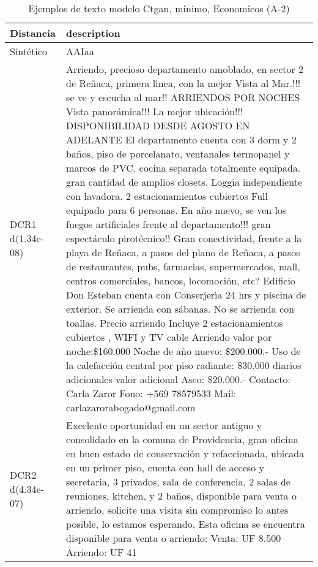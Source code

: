 \begin{table}[H]
\centering
\fontsize{10}{14}\selectfont
\caption{Ejemplos de texto modelo Ctgan, minimo, Economicos (A-2)}
\label{table-example-economicos-a-2-ctgan-min-text}
\begin{tabular}{|l|m{35em}|}
\hline
\rowcolor[gray]{0.8}
Distancia & description \\
\hline Sintético & AAIaa \\
\hline DCR1 d(1.34e-08) & Arriendo, precioso departamento amoblado, en sector 2 de Re\~naca, primera l{\'\i}nea, con la mejor Vista al Mar.!!! se ve y escucha al mar!! ARRIENDOS POR NOCHES Vista panor\'amica!!! La mejor ubicaci\'on!!! DISPONIBILIDAD DESDE AGOSTO EN ADELANTE El departamento cuenta con 3 dorm y 2 ba\~nos, piso de porcelanato, ventanales termopanel y marcos de PVC. cocina separada totalmente equipada. gran cantidad de amplios closets. Loggia independiente con lavadora. 2 estacionamientos cubiertos Full equipado para 6 personas. En a\~no nuevo, se ven los fuegos artificiales frente al departamento!!! gran espect\'aculo pirot\'ecnico!! Gran conectividad, frente a la playa de Re\~naca, a pasos del plano de Re\~naca, a pasos de restaurantes, pubs, farmacias, supermercados, mall, centros comerciales, bancos, locomoci\'on, etc?  Edificio Don Esteban cuenta con Conserjer{\'\i}a 24 hrs y piscina de exterior.  Se arrienda con s\'abanas.  No se arrienda con toallas.  Precio arriendo Incluye 2 estacionamientos cubiertos , WIFI y TV cable  Arriendo valor por noche:\$160.000  Noche de a\~no nuevo: \$200.000.-  Uso de la calefacci\'on central por piso radiante: \$30.000 diarios adicionales  valor adicional Aseo: \$20.000.-  Contacto: Carla Zaror Fono: +569 78579533 Mail: carlazarorabogado@gmail.com \\
\hline DCR2 d(4.34e-07) & Excelente oportunidad en un sector antiguo y consolidado en la comuna de Providencia, gran oficina en buen estado de conservaci\'on y refaccionada, ubicada en un primer piso, cuenta con hall de acceso y secretaria, 3 privados, sala de conferencia, 2 salas de reuniones, kitchen, y 2 ba\~nos, disponible para venta o arriendo, solicite una visita sin compromiso lo antes posible, lo estamos esperando. Esta oficina se encuentra disponible para venta o arriendo: Venta: UF 8.500 Arriendo: UF 41 \\
\hline
\end{tabular}
\end{table}

